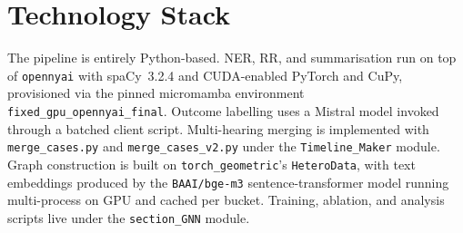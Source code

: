 \section{Technology Stack}

The pipeline is entirely Python-based. NER, RR, and summarisation run
on top of \texttt{opennyai} with spaCy~3.2.4 and CUDA-enabled PyTorch
and CuPy, provisioned via the pinned micromamba environment
\texttt{fixed\_gpu\_opennyai\_final}. Outcome labelling uses a Mistral
model invoked through a batched client script. Multi-hearing merging is
implemented with \texttt{merge\_cases.py} and \texttt{merge\_cases\_v2.py}
under the \texttt{Timeline\_Maker} module. Graph construction is built
on \texttt{torch\_geometric}'s \texttt{HeteroData}, with text
embeddings produced by the \texttt{BAAI/bge-m3} sentence-transformer
model running multi-process on GPU and cached per bucket. Training,
ablation, and analysis scripts live under the \texttt{section\_GNN}
module.
